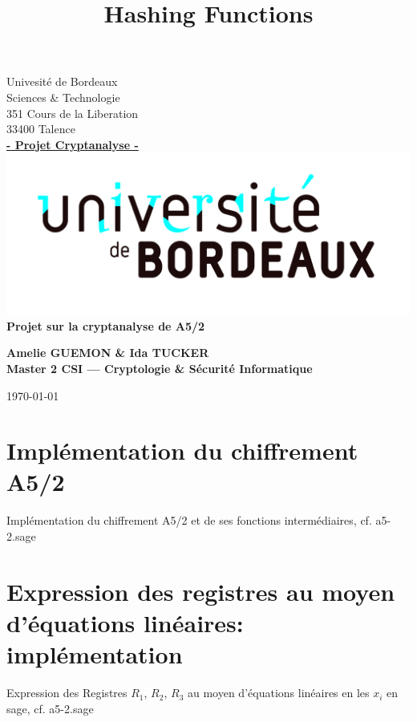 \documentclass[a4paper]{article}
\title{Hashing Functions}
\author{}
\begin{document}
\begin{titlepage}
  \begin{sffamily}
    \begin{center}

      Univesité de Bordeaux\\ Sciences \& Technologie\\
      351 Cours de la Liberation\\33400 Talence\\[1em]
      \textbf{\underline{- Projet Cryptanalyse -}}\\[1.5cm]
      
      \includegraphics[scale=0.11]{UB.jpg}
      \\[3cm]
      
      { \huge \bfseries Projet sur la cryptanalyse de A5/2\\[0.5cm] }
      \begin{flushright}
        \bfseries {Amelie GUEMON \& Ida TUCKER\\[1em]Master 2 CSI --- Cryptologie \& Sécurité Informatique}\\[6.6cm]
      \end{flushright}
      
      
      \today

    \end{center}
  \end{sffamily}
\end{titlepage}

\section{Implémentation du chiffrement A5/2}
Implémentation du chiffrement A5/2 et de ses fonctions intermédiaires, cf. a5-2.sage



\section{Expression des registres au moyen d'équations linéaires: implémentation}
Expression des Registres $R_1$, $R_2$, $R_3$ au moyen d'équations linéaires en les $x_i$ en sage, cf. a5-2.sage
\end{document}
